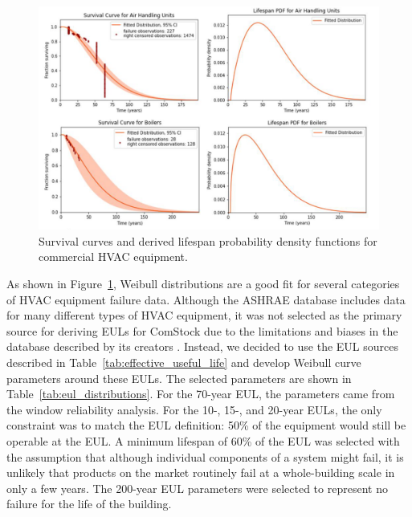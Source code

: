 \begin{figure} [ht!]
\includegraphics[width=\textwidth]{figures/ashrae_equip_lifespans2.png}
\centering
\caption[Survival curves and derived lifespan probability density functions for HVAC equipment]{Survival curves and derived lifespan probability density functions for commercial HVAC equipment.}
\label{fig:hvac_survival_curves}
\end{figure}

As shown in Figure~\ref{fig:hvac_survival_curves}, Weibull distributions are a good fit for several categories of HVAC equipment failure data. Although the ASHRAE database includes data for many different types of HVAC equipment, it was not selected as the primary source for deriving EULs for ComStock due to the limitations and biases in the database described by its creators \citep{ashrae_reliability_db_article}.
Instead, we decided to use the EUL sources described in Table~\ref{tab:effective_useful_life} and develop Weibull curve parameters around these EULs. The selected parameters are shown in Table~\ref{tab:eul_distributions}. For the 70-year EUL, the parameters came from the window reliability analysis. For the 10-, 15-, and 20-year EULs, the only constraint was to match the EUL definition: 50\% of the equipment would still be operable at the EUL. A minimum lifespan of 60\% of the EUL was selected with the assumption that although individual components of a system might fail, it is unlikely that products on the market routinely fail at a whole-building scale in only a few years. The 200-year EUL parameters were selected to represent no failure for the life of the building.



